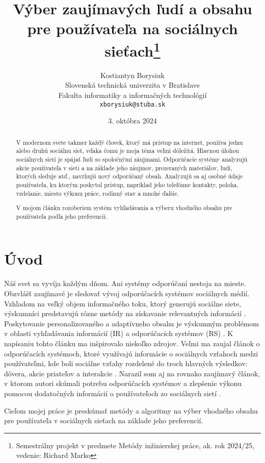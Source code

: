 \documentclass[10pt,twoside,slovak,a4paper]{article}
\title{Výber zaujímavých ľudí a obsahu pre používateľa na sociálnych sieťach\thanks{Semestrálny projekt v predmete Metódy inžinierskej práce, ak. rok 2024/25, vedenie: Richard Marko}} %
\author{Kostiantyn Borysiuk\\[2pt]
	{\small Slovenská technická univerzita v Bratislave}\\
	{\small Fakulta informatiky a informačných technológií}\\
	{\small \texttt{xborysiuk@stuba.sk}}
	}
\date{\small 3. októbra 2024} %
\begin{document}
\maketitle

\begin{abstract}
V modernom svete takmer každý človek, ktorý má prístup na internet, používa jednu alebo druhú sociálnu sieť, vďaka čomu je moja téma veľmi dôležitá. Hlavnou úlohou sociálnych sietí je spájať ľudí so spoločnými záujmami.
Odporúčacie systémy analyzujú akcie používateľa v sieti a na základe jeho záujmov, prezeraných materiálov, ľudí, ktorých sleduje atď., navrhujú nový odporúčaný obsah. Analyzujú sa aj osobné údaje používateľa, ku ktorým poskytol prístup, napríklad jeho telefónne kontakty, poloha, vzdelanie, miesto výkonu práce, rodinný stav a mnohé ďalšie.

V mojom článku rozoberiem systém vyhľadávania a výberu vhodného obsahu pre používateľa podľa jeho preferencií.
\end{abstract}



\section{Úvod}
Náš svet sa vyvíja každým dňom. Ani systémy odporúčaní nestoja na mieste. Obzvlášť zaujímavé je sledovať vývoj odporúčacích systémov sociálnych médií. Vzhľadom na veľký objem informačného toku, ktorý generujú sociálne siete, výskumníci predstavujú rôzne metódy na získavanie relevantných informácií \cite{diego01}. Poskytovanie personalizovaného a adaptívneho obsahu je výskumným problémom v oblasti vyhľadávania informácií (IR) a odporúčacích systémov (RS) \cite{diego01}. K napísaniu tohto článku ma inšpirovalo niekoľko zdrojov. Veľmi ma zaujal článok o odporúčacích systémoch, ktoré využívajú informácie o sociálnych
vzťahoch medzi používateľmi, kde boli sociálne vzťahy rozdelené do troch hlavných výsledkov: dôvera, akcie priateľov a interakcie \cite{diego01}. Narazil som aj na rovnako zaujímavý článok, v ktorom autori skúmali potrebu odporúčacích systémov a zlepšenie výkonu pomocou dodatočných informácií o používateľoch zo sociálnych sietí \cite{chen02}.

Cieľom mojej práce je preskúmať metódy a algoritmy na výber vhodného obsahu pre používateľa v sociálnych sieťach na základe jeho preferencií.
\end{document}
